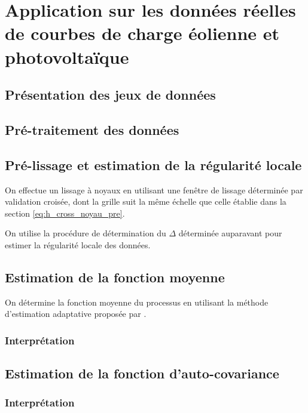 \section{
  Application sur les données réelles de courbes de charge éolienne et photovoltaïque
 }

\subsection{Présentation des jeux de données}

\subsection{Pré-traitement des données}

\subsection{Pré-lissage et estimation de la régularité locale}

On effectue un lissage à noyaux en utilisant une fenêtre de lissage déterminée par validation croisée, dont la grille suit la même échelle que celle établie dans la section \ref{eq:h_cross_noyau_pre}.


On utilise la procédure de détermination du $\Delta$ déterminée auparavant pour estimer la régularité locale des données.

\subsection{Estimation de la fonction moyenne}

On détermine la fonction moyenne du processus en utilisant la méthode d'estimation adaptative proposée par \cite{golovkine2021adaptive}.

\subsubsection{Interprétation}

\subsection{Estimation de la fonction d'auto-covariance}

\subsubsection{Interprétation}

